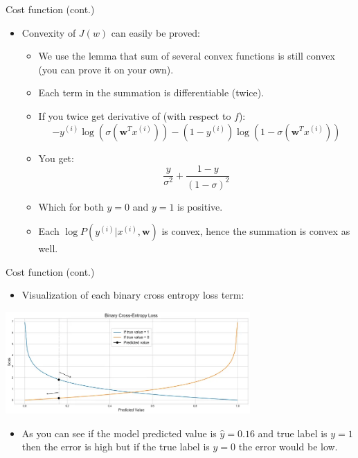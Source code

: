 \documentclass[serif, aspectratio=169]{beamer}
\begin{document}
\begin{frame}{Cost function (cont.)}
    \begin{itemize}
    \item Convexity of $J(w)$ can easily be proved:
        \begin{itemize}
            \item We use the lemma that sum of several convex functions is still convex (you can prove it on your own).
            \item Each term in the summation is differentiable (twice).
            \item If you twice get derivative of (with respect to $f$):
                \[
                    -y^{(i)}\log (\sigma (\mathbf{w}^T x^{(i)})) - 
            (1-y^{(i)})\log (1 - \sigma (\mathbf{w}^T x^{(i)}))
                \]
            \item You get:
                \[
                    \frac{y}{\sigma ^2} + \frac{1-y}{(1-\sigma )^2}
                \]
            \item Which for both $y=0$ and $y=1$ is positive.
            \item Each $\log P(y^{(i)}|x^{(i)}, \mathbf{w})$ is convex, hence the summation is convex as well.
        \end{itemize}
    \end{itemize}
\end{frame}
\begin{frame}{Cost function (cont.)}
    \begin{itemize}
    \item Visualization of each binary cross entropy loss term:
    \end{itemize}
    \begin{center}
        \includegraphics[width=0.7\textwidth]{pic/BCE2.png}
    \end{center}
    
    
    \begin{itemize}
        \item As you can see if the model predicted value is $\hat{y}=0.16$ and true label is $y=1$ then the error is high but if the true label is $y=0$ the error would be low.
    \end{itemize}
    \vfill
\end{frame}
\end{document}
